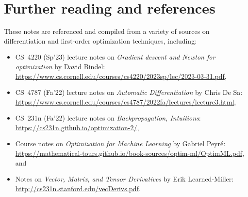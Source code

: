 
\section*{Further reading and references}
\label{sec:further}

These notes are referenced and compiled from a variety of sources on differentiation and first-order optimization techniques, including:
\begin{itemize}[itemsep=0pt]
    \item CS~4220 (Sp'23) lecture notes on \textit{Gradient descent and Newton for optimization} by David Bindel: \url{https://www.cs.cornell.edu/courses/cs4220/2023sp/lec/2023-03-31.pdf},
    \item CS~4787 (Fa'22) lecture notes on \textit{Automatic Differentiation} by Chris De Sa: \url{https://www.cs.cornell.edu/courses/cs4787/2022fa/lectures/lecture3.html},
    \item CS~231n (Fa'22) lecture notes on \textit{Backpropagation, Intuitions}: \url{https://cs231n.github.io/optimization-2/},
    \item Course notes on \textit{Optimization for Machine Learning} by Gabriel Peyr{\'{e}}: \url{https://mathematical-tours.github.io/book-sources/optim-ml/OptimML.pdf}, and
    \item Notes on \textit{Vector, Matrix, and Tensor Derivatives} by Erik Learned-Miller: \url{http://cs231n.stanford.edu/vecDerivs.pdf}.
\end{itemize}
